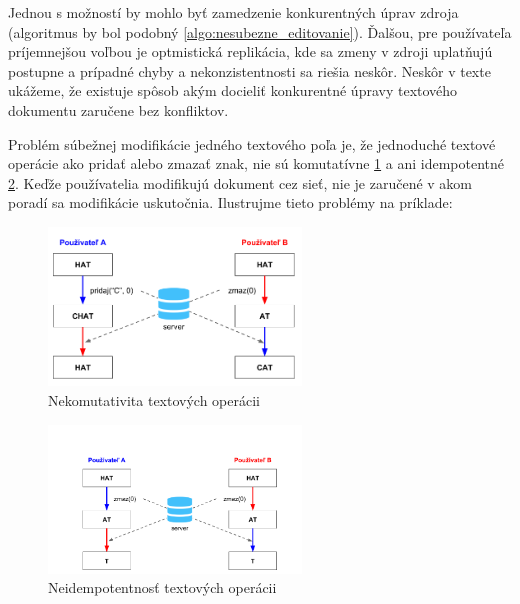 Jednou s možností by mohlo byť zamedzenie konkurentných úprav zdroja (algoritmus by bol podobný
\ref{algo:nesubezne_editovanie}). Ďalšou, pre používateľa príjemnejšou voľbou je optmistická
replikácia, kde sa zmeny v zdroji uplatňujú postupne a prípadné chyby a nekonzistentnosti sa
riešia neskôr. Neskôr v texte ukážeme, že existuje spôsob akým docieliť konkurentné úpravy 
textového dokumentu zaručene bez konfliktov. %

Problém súbežnej modifikácie jedného textového poľa je, že jednoduché textové operácie ako
pridať alebo zmazať znak, nie sú komutatívne \ref{obr:nekomutativita} a ani 
idempotentné \ref{obr:neidempotentnost}. Keďže používatelia
modifikujú dokument cez sieť, nie je zaručené v akom poradí sa modifikácie uskutočnia. 
\cite {medium_crdt}
Ilustrujme tieto problémy na príklade:

\begin{figure}[h]
\centerline{\includegraphics[width=0.6\textwidth]{images/nekomutativne_operacie}}
\caption[Nekomutativita textových operácii]{Nekomutativita textových operácii}
\label{obr:nekomutativita}
\end{figure}

\begin{figure}[h]
\centerline{\includegraphics[width=0.6\textwidth]{images/neidempotentne_operacie}}
\caption[Neidempotentnosť textových operácii]{Neidempotentnosť textových operácii}
\label{obr:neidempotentnost}
\end{figure}

